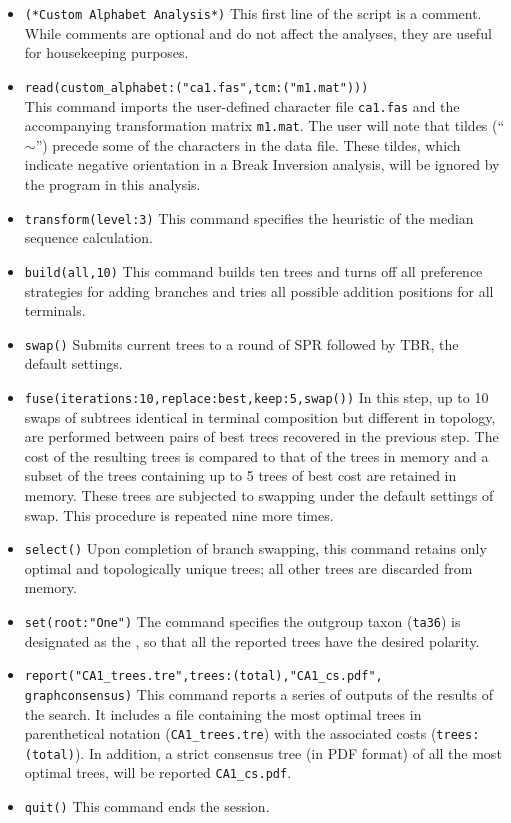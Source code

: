\begin{itemize}
\item \texttt{(*Custom Alphabet Analysis*)} This first line of the script is a comment. While comments 
are optional and do not affect the analyses, they are useful for housekeeping purposes.
\item \texttt{read(custom\_alphabet:("ca1.fas",tcm:("m1.mat")))} \\ This command imports the 
user-defined  character file \texttt{ca1.fas} and the accompanying 
transformation matrix \texttt{m1.mat}. The user will note that tildes (``$\sim$'') precede some of the characters
in the data file.  These tildes, which indicate negative orientation in a Break Inversion analysis, will be ignored by the 
program in this analysis.
\item \texttt{transform(level:3)} This command specifies the heuristic  of the median sequence 
calculation.
\item \texttt{build(all,10)} This command builds ten trees and turns off all preference strategies for adding branches 
and tries all possible addition positions for all terminals.
\item \texttt{swap()} Submits current trees to a round of SPR followed by TBR, the default settings.
\item \texttt{fuse(iterations:10,replace:best,keep:5,swap())} In this step, up to 10 swaps of subtrees identical in terminal 
composition but different in topology, are performed between pairs of best trees recovered in the previous 
step. The cost of the resulting trees is compared to that of the trees in memory and a subset of the trees containing up to 5 
trees of best cost are retained in memory. These trees are subjected to swapping under the default settings of swap. 
This procedure is repeated nine more times.
\item \texttt{select()} Upon completion of branch swapping, this command retains only optimal and 
topologically unique trees; all other trees are discarded from memory.
\item \texttt{set(root:"One")} The  command specifies the outgroup taxon (\texttt{ta36}) 
is designated as the , so that all the reported trees have the desired polarity.
\item \texttt{report("CA1\_trees.tre",trees:(total),"CA1\_cs.pdf", \\ graphconsensus)} This command reports a series of outputs
of the results of the search.  It includes a file containing the most optimal trees in parenthetical notation (\texttt{CA1\_trees.tre}) 
with the associated costs (\texttt{trees:(total)}).  In addition, a strict consensus tree (in PDF format) of all the most 
optimal trees, will be reported \texttt{CA1\_cs.pdf}.
\item \texttt{quit()} This command ends the \poy session.
\end{itemize}

